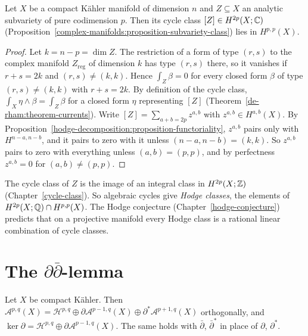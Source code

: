\begin{proposition}\label{hodge-decomposition:proposition-cycle-classes-type}
Let $X$ be a compact K\"ahler manifold of dimension $n$ and $Z \subseteq X$ an analytic subvariety of pure codimension $p$. Then its cycle
class $[Z] \in H^{2p}(X; \mathbb{C})$ (Proposition~\ref{complex-manifolds:proposition-subvariety-class}) lies in $H^{p,p}(X)$.
\end{proposition}

\begin{proof}
Let $k = n - p = \dim Z$. The restriction of a form of type $(r,s)$ to the complex manifold $Z_{\mathrm{reg}}$ of dimension $k$ has type
$(r,s)$ there, so it vanishes if $r + s = 2k$ and $(r,s) \neq (k,k)$. Hence $\int_Z\beta = 0$ for every closed form $\beta$ of type
$(r,s) \neq (k,k)$ with $r + s = 2k$. By definition of the cycle class, $\int_X\eta \wedge \beta = \int_Z\beta$ for a closed form $\eta$
representing $[Z]$ (Theorem~\ref{de-rham:theorem-currents}). Write $[Z] = \sum_{a+b=2p}z^{a,b}$ with $z^{a,b} \in H^{a,b}(X)$. By
Proposition~\ref{hodge-decomposition:proposition-functoriality}, $z^{a,b}$ pairs only with $H^{n-a,n-b}$, and it pairs to zero with it
unless $(n-a, n-b) = (k,k)$. So $z^{a,b}$ pairs to zero with everything unless $(a,b) = (p,p)$, and by perfectness $z^{a,b} = 0$ for
$(a,b) \neq (p,p)$.
\end{proof}

\begin{remark}\label{hodge-decomposition:remark-hodge-classes}
The cycle class of $Z$ is the image of an integral class in $H^{2p}(X; \mathbb{Z})$ (Chapter~\ref{cycle-class}). So algebraic cycles give
\emph{Hodge classes}, the elements of $H^{2p}(X; \mathbb{Q}) \cap H^{p,p}(X)$. The Hodge conjecture (Chapter~\ref{hodge-conjecture}) predicts that
on a projective manifold every Hodge class is a rational linear combination of cycle classes.
\end{remark}

\section{The $\partial\bar\partial$-lemma}\label{hodge-decomposition:section-ddbar-lemma}

\begin{lemma}\label{hodge-decomposition:lemma-del-hodge}
Let $X$ be compact K\"ahler. Then
$\mathcal{A}^{p,q}(X) = \mathcal{H}^{p,q} \oplus \partial\mathcal{A}^{p-1,q}(X) \oplus \partial^*\mathcal{A}^{p+1,q}(X)$ orthogonally, and
$\ker\partial = \mathcal{H}^{p,q} \oplus \partial\mathcal{A}^{p-1,q}(X)$. The same holds with $\bar\partial$, $\bar\partial^*$ in place of
$\partial$, $\partial^*$.
\end{lemma}

